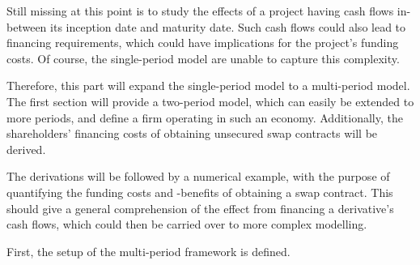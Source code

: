 \documentclass[main.tex]{subfiles}
\begin{document}
    Still missing at this point is to study the effects of a project
    having cash flows in-between its inception date and maturity date.
    Such cash flows could also lead to financing requirements,
    which could have implications for the project's funding costs.
    Of course, the single-period model are unable to capture this complexity.

    Therefore, this part will expand the single-period model to a multi-period model.
    The first section will provide a two-period model, 
    which can easily be extended to more periods,
    and define a firm operating in such an economy.
    Additionally, the shareholders' financing costs 
    of obtaining unsecured swap contracts will be derived.

    The derivations will be followed by a numerical example,
    with the purpose of quantifying the funding costs and -benefits of obtaining a swap contract.
    This should give a general comprehension of the effect from financing a derivative's cash flows,
    which could then be carried over to more complex modelling.

    First, the setup of the multi-period framework is defined.
\end{document}
